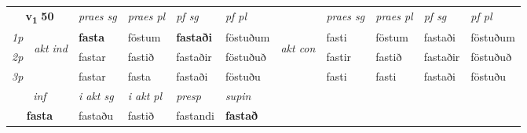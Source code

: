 \noindent
\begin{tabular}{lllllllllll} \toprule
\multicolumn{2}{c}{\textbf{v{\textsubscript{1}}} \Large{\textbf{50}}}  &  \textit{praes sg}  & \textit{praes pl}  &\textit{ pf sg} & \textit{pf pl} &  &  \textit{praes sg}  & \textit{praes pl}  & \textit{pf sg} & \textit{pf pl } \\*
	\cmidrule{3-6} \cmidrule{8-11}
 {\textit{1p}} & \multirow{3}{*}{\begin{turn}{90}\textit{akt ind}\end{turn}} & \textbf{fasta} & föstum & \textbf{fastaði} & föstuðum & \multirow{3}{*}{\begin{turn}{90}\textit{akt con}\end{turn}} &fasti & föstum & fastaði & föstuðum\\*
 {\textit{2p}} &  &  fastar  & fastið & fastaðir & föstuðuð & & fastir & fastið & fastaðir & föstuðuð \\*
{\textit{3p}} &  & fastar & fasta & fastaði & föstuðu & & fasti & fasti& fastaði & föstuðu \\*
\cmidrule{3-6} \cmidrule{8-11}

   \multicolumn{2}{c}{\textit{inf}}  & \textit{i akt sg} & \textit{i akt pl}   & \textit{presp} & \textit{supin}   \\*
  \multicolumn{2}{c}{\textbf{fasta}} & fastaðu  & fastið   & fastandi &  \textbf{fastað}   \\*
\end{tabular}

